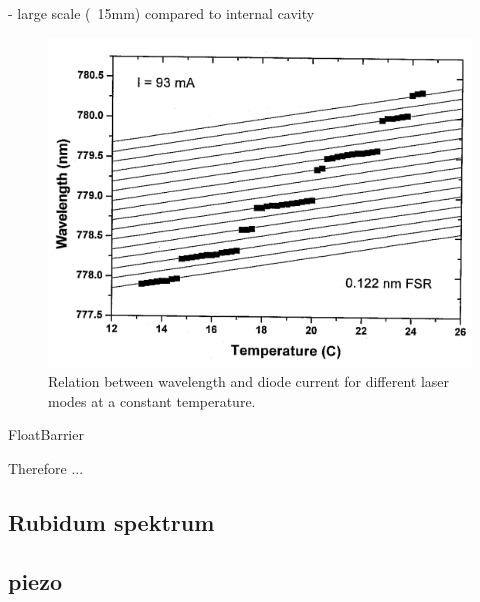 - large scale (~15mm) compared to internal cavity






\FloatBarrier
\begin{figure}
  \includegraphics{medium_gain_temperature.png}
  \caption{Relation between wavelength and diode current
           for different laser modes at a constant temperature.}
  \label{fig:medium_gain_temperature}
\end{figure}
FloatBarrier





Therefore ...


\subsection{Rubidum spektrum}
\label{subsec:}


\subsection{piezo}
\label{subsec:}
